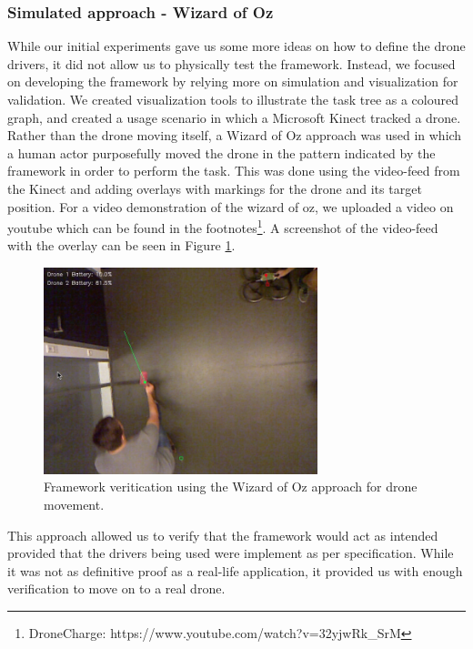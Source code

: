 \subsubsection{Simulated approach - Wizard of Oz}
While our initial experiments gave us some more ideas on how to define the drone drivers, it did not allow us to physically test the framework. Instead, we focused on developing the framework by relying more on simulation and visualization for validation. We created visualization tools to illustrate the task tree as a coloured graph, and created a usage scenario in which a Microsoft Kinect tracked a drone. Rather than the drone moving itself, a Wizard of Oz approach was used in which a human actor purposefully moved the drone in the pattern indicated by the framework in order to perform the task. This was done using the video-feed from the Kinect and adding overlays with markings for the drone and its target position. For a video demonstration of the wizard of oz, we uploaded a video on youtube which can be found in the footnotes\footnote{DroneCharge: https://www.youtube.com/watch?v=32yjwRk\_SrM}. A screenshot of the video-feed with the overlay can be seen in Figure \ref{fig:wizardofoz}.

\begin{figure}[h]
\begin{center}
\includegraphics[height=6cm]{images/wizardofoz.png}
\caption{Framework veritication using the Wizard of Oz approach for drone movement.}
\label{fig:wizardofoz}
\end{center}
\end{figure}

This approach allowed us to verify that the framework would act as intended provided that the drivers being used were implement as per specification.  While it was not as definitive proof as a real-life application, it provided us with enough verification to move on to a real drone.

